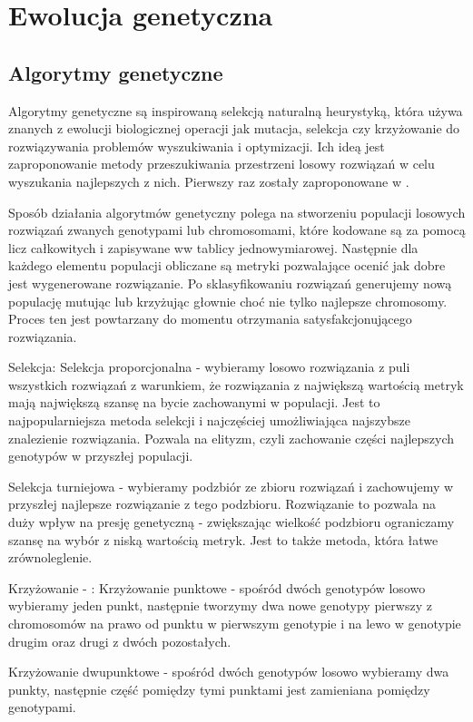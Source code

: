 \section{Ewolucja genetyczna}
\label{sec:ewolucjaGenetyczne}
\subsection{Algorytmy genetyczne}
Algorytmy genetyczne są inspirowaną selekcją naturalną  heurystyką, która używa znanych z ewolucji biologicznej operacji jak mutacja, selekcja czy krzyżowanie do rozwiązywania problemów wyszukiwania i optymizacji. Ich ideą jest zaproponowanie metody przeszukiwania przestrzeni losowy rozwiązań w celu wyszukania najlepszych z nich. Pierwszy raz zostały zaproponowane w \cite{10.5555/138936}.

Sposób działania algorytmów genetyczny polega na stworzeniu populacji losowych rozwiązań zwanych genotypami lub chromosomami, które kodowane są za pomocą licz całkowitych i zapisywane ww tablicy jednowymiarowej. Następnie dla każdego elementu populacji obliczane są metryki pozwalające ocenić jak dobre jest wygenerowane rozwiązanie. Po sklasyfikowaniu rozwiązań generujemy nową populację mutując lub krzyżując głownie choć nie tylko najlepsze chromosomy. Proces ten jest powtarzany do momentu otrzymania satysfakcjonującego rozwiązania.  

Selekcja:
Selekcja proporcjonalna - wybieramy losowo rozwiązania z puli wszystkich rozwiązań z warunkiem, że rozwiązania z największą wartością metryk mają największą szansę na bycie zachowanymi w populacji. Jest to najpopularniejsza metoda selekcji i najczęściej umożliwiająca najszybsze znalezienie rozwiązania. Pozwala na elityzm, czyli zachowanie części najlepszych genotypów w przyszłej populacji.

Selekcja turniejowa - wybieramy podzbiór ze zbioru rozwiązań i zachowujemy w przyszłej najlepsze rozwiązanie z tego podzbioru.
Rozwiązanie to pozwala na duży wpływ na presję genetyczną - zwiększając wielkość podzbioru ograniczamy szansę na wybór z niską wartością metryk.  Jest to także metoda, która łatwe zrównoleglenie.

Krzyżowanie - :
Krzyżowanie punktowe - spośród dwóch genotypów losowo wybieramy jeden punkt, następnie tworzymy dwa nowe genotypy pierwszy z chromosomów na prawo od punktu w pierwszym genotypie i na lewo w genotypie drugim oraz drugi z dwóch pozostałych.

Krzyżowanie dwupunktowe - spośród dwóch genotypów losowo wybieramy dwa punkty, następnie część pomiędzy tymi punktami jest zamieniana pomiędzy genotypami.

